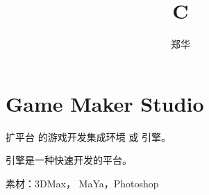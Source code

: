 \documentclass[UTF8,a4paper,8pt]{ctexart}
\author{郑华}
\title{C}
\begin{document}
 
 	\maketitle
   
 
 
 \section{Game Maker Studio}
  扩平台  的游戏开发集成环境 或 引擎。
 		     
 		     
  引擎是一种快速开发的平台。
  
  
  素材：3DMax，  MaYa，Photoshop
\end{document}
